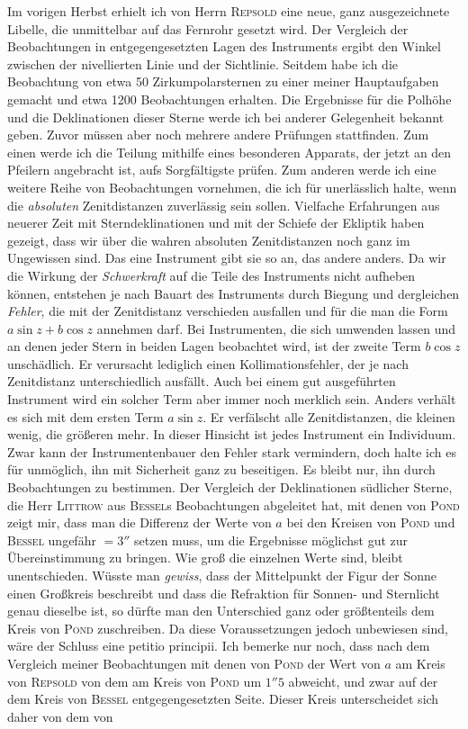 \par\indent Im vorigen Herbst erhielt ich von Herrn \textsc{Repsold} eine neue, ganz ausgezeichnete Libelle, die unmittelbar auf das Fernrohr gesetzt wird. Der Vergleich der Beobachtungen in entgegengesetzten Lagen des Instruments ergibt den Winkel zwischen der nivellierten Linie und der Sichtlinie. Seitdem habe ich die Beobachtung von etwa 50 Zirkumpolarsternen zu einer meiner Hauptaufgaben gemacht und etwa 1200 Beobachtungen erhalten. Die Ergebnisse für die Polhöhe und die Deklinationen dieser Sterne werde ich bei anderer Gelegenheit bekannt geben. Zuvor müssen aber noch mehrere andere Prüfungen stattfinden. Zum einen werde ich die Teilung mithilfe eines besonderen Apparats, der jetzt an den Pfeilern angebracht ist, aufs Sorgfältigste prüfen. Zum anderen werde ich eine weitere Reihe von Beobachtungen vornehmen, die ich für unerlässlich halte, wenn die \emph{absoluten} Zenitdistanzen zuverlässig sein sollen. Vielfache Erfahrungen aus neuerer Zeit mit Sterndeklinationen und mit der Schiefe der Ekliptik haben gezeigt, dass wir über die wahren absoluten Zenitdistanzen noch ganz im Ungewissen sind. Das eine Instrument gibt sie so an, das andere anders. Da wir die Wirkung der \emph{Schwerkraft} auf die Teile des Instruments nicht aufheben können, entstehen je nach Bauart des Instruments durch Biegung und dergleichen \emph{Fehler}, die mit der Zenitdistanz verschieden ausfallen und für die man die Form $a\sin z+b\cos z$ annehmen darf. Bei Instrumenten, die sich umwenden lassen und an denen jeder Stern in beiden Lagen beobachtet wird, ist der zweite Term $b\cos z$ unschädlich. Er verursacht lediglich einen Kollimationsfehler, der je nach Zenitdistanz unterschiedlich ausfällt. Auch bei einem gut ausgeführten Instrument wird ein solcher Term aber immer noch merklich sein. Anders verhält es sich mit dem ersten Term $a\sin z$. Er verfälscht alle Zenitdistanzen, die kleinen wenig, die größeren mehr. In dieser Hinsicht ist jedes Instrument ein Individuum. Zwar kann der Instrumentenbauer den Fehler stark vermindern, doch halte ich es für unmöglich, ihn mit Sicherheit ganz zu beseitigen. Es bleibt nur, ihn durch Beobachtungen zu bestimmen. Der Vergleich der Deklinationen südlicher Sterne, die Herr \textsc{Littrow} aus \textsc{Bessel}s Beobachtungen abgeleitet hat, mit denen von \textsc{Pond} zeigt mir, dass man die Differenz der Werte von $a$ bei den Kreisen von \textsc{Pond} und \textsc{Bessel} ungefähr $=3''$ setzen muss, um die Ergebnisse möglichst gut zur Übereinstimmung zu bringen. Wie groß die einzelnen Werte sind, bleibt unentschieden. Wüsste man \emph{gewiss}, dass der Mittelpunkt der Figur der Sonne einen Großkreis beschreibt und dass die Refraktion für Sonnen- und Sternlicht genau dieselbe ist, so dürfte man den Unterschied ganz oder größtenteils dem Kreis von \textsc{Pond} zuschreiben. Da diese Voraussetzungen jedoch unbewiesen sind, wäre der Schluss eine petitio principii. Ich bemerke nur noch, dass nach dem Vergleich meiner Beobachtungen mit denen von \textsc{Pond} der Wert von $a$ am Kreis von \textsc{Repsold} von dem am Kreis von \textsc{Pond} um $1''5$ abweicht, und zwar auf der dem Kreis von \textsc{Bessel} entgegengesetzten Seite. Dieser Kreis unterscheidet sich daher von dem von 